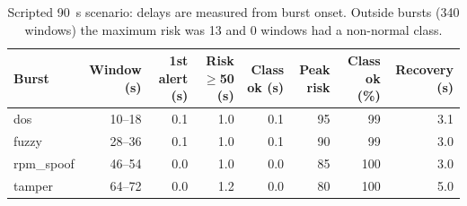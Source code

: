\begin{table}[t]
\centering
\caption{Scripted 90~s scenario: delays are measured from burst onset. Outside bursts (340 windows) the maximum risk was 13 and 0 windows had a non-normal class.}
\label{tab:sys_cyber_timeline}
\scriptsize
\begin{tabular}{lrrrrrrr}
\toprule
Burst & Window (s) & 1st alert (s) & Risk$\geq$50 (s) & Class ok (s) & Peak risk & Class ok (\%) & Recovery (s) \\
\midrule
dos & 10--18 & 0.1 & 1.0 & 0.1 & 95 & 99 & 3.1 \\
fuzzy & 28--36 & 0.1 & 1.0 & 0.1 & 90 & 99 & 3.0 \\
rpm\_spoof & 46--54 & 0.0 & 1.0 & 0.0 & 85 & 100 & 3.0 \\
tamper & 64--72 & 0.0 & 1.2 & 0.0 & 80 & 100 & 5.0 \\
\bottomrule
\end{tabular}
\end{table}
